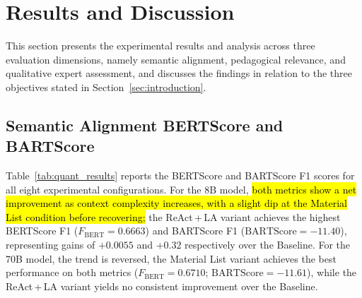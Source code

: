 \documentclass[conference,a4paper]{IEEEtran}
\begin{document}


\section{Results and Discussion}\label{sec:results}

This section presents the experimental results and 
analysis across three evaluation dimensions, namely semantic
alignment, pedagogical relevance, and qualitative
expert assessment, and discusses the findings in 
relation to the three objectives stated
in Section~\ref{sec:introduction}.

\subsection{Semantic Alignment BERTScore and BARTScore}

Table~\ref{tab:quant_results} reports the BERTScore
and BARTScore F1 scores for all eight experimental
configurations. For the 8B model, \hl{both metrics show
a net improvement as context complexity increases,
with a slight dip at the Material List condition
before recovering;} the ReAct\,+\,LA
variant achieves the highest BERTScore F1
($F_{\text{BERT}} = 0.6663$) and BARTScore F1
($\text{BARTScore} = -11.40$), representing gains
of $+0.0055$ and $+0.32$ respectively over the
Baseline. For the 70B model, the trend is reversed,
the Material List variant achieves the best
performance on both metrics
($F_{\text{BERT}} = 0.6710$;
$\text{BARTScore} = -11.61$),
while the ReAct\,+\,LA variant yields no consistent
improvement over the Baseline.
\end{document}

